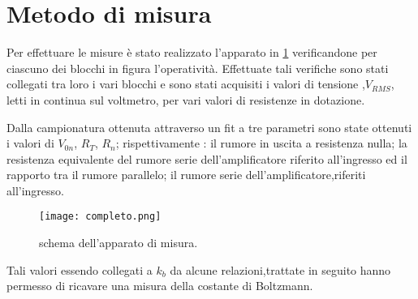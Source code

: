 \section{Metodo di misura}	 
	Per effettuare le misure è stato realizzato l'apparato in \figurename{ \ref{fig:completo}}
	verificandone per ciascuno dei blocchi in figura l'operatività.
	Effettuate tali verifiche sono stati collegati tra loro i vari blocchi
	e sono stati acquisiti i valori di tensione ,$V_{RMS}$, letti in continua sul voltmetro, 
	per vari valori di resistenze in dotazione.
	
	Dalla campionatura ottenuta attraverso un fit a tre parametri sono state ottenuti i valori 
	di $V_{0n}$, $R_{T}$, $R_{n}$; rispettivamente : il rumore in uscita a resistenza nulla; la resistenza equivalente del rumore serie dell'amplificatore riferito all'ingresso ed il rapporto tra il rumore parallelo; il rumore serie dell’amplificatore,riferiti all’ingresso.
	
	\begin{figure}[h]
			\centering
			\texttt{[image: completo.png]}
			\caption{schema dell'apparato di misura.}
			\label{fig:completo}
	\end{figure}

	Tali valori essendo collegati a $k_{b}$ da alcune relazioni,trattate in seguito hanno permesso
	di ricavare una misura della costante di Boltzmann. 
	